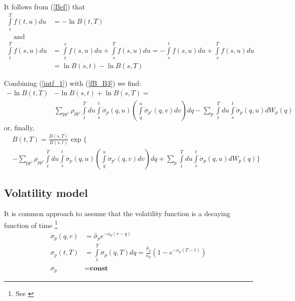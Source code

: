\documentclass[10pt]{article}
\begin{document}
It follows from (\ref{Bef}) that
\begin{align}
\nonumber  \int \limits_t^T f(t,u)du &=  -\ln B(t,T) \\
\nonumber  \quad \text{and} \\
\nonumber \int \limits_t^T f(s,u) du &=\int \limits_t^s f(s,u)du +  \int \limits_s^T f(s,u)du=-\int \limits_s^t f(s,u)du +  \int \limits_s^T f(s,u)du \\ 
\label{fB_B3}
& =\ln B(s,t) - \ln B(s,T)
\end{align}

Combining (\ref{intf_1}) with (\ref{fB_B3}) we find:
\begin{align}
\nonumber -\ln B(t,T)&- \ln B(s,t) +\ln B(s,T)=  \\
\label{Bs2}
& \sum \limits_{pp'} \rho_{pp'} \int \limits_t^T du \int \limits_s^t \dot {\sigma}_p(q,u) \left(\int \limits_q^u \dot {\sigma}_{p'}(q,v)dv \right)dq - \sum \limits_p \int \limits_t^T du \int \limits_s^t \dot {\sigma}_p(q,u)dW_p(q)
\end{align}
or, finally,
\begin{align}
\nonumber &B(t,T)= \frac{B(s,T)}{B(s,t)} \exp \Big\{ \\
\label{Bsexp2}
& -\sum \limits_{pp'} \rho_{pp'} \int \limits_t^T du \int \limits_s^t \dot {\sigma}_p(q,u) \left(\int \limits_q^u \dot {\sigma}_{p'}(q,v)dv \right)dq + \sum \limits_p \int \limits_t^T du \int \limits_s^t \dot {\sigma}_p(q,u)dW_p(q) \Big\}
\end{align}

\subsection{Volatility model}
It is common approach to assume that the volatility function is a decaying function of time \footnote{See \citep{chiarella}}
\begin{align}
\label{vol}
\dot{\sigma}_p (q,r)&= \hat {\sigma}_p e^{-\kappa_p (r-q)} \\
\sigma_p(t,T)&=\int \limits_t^T \dot{\sigma}_p(q,T) dq = \frac{\hat{\sigma}_p}{\kappa_p}\left(1-e^{-\kappa_p (T-t)} \right) \\
\hat{\sigma}_p &= \textbf{const}
\end{align}
\end{document}
